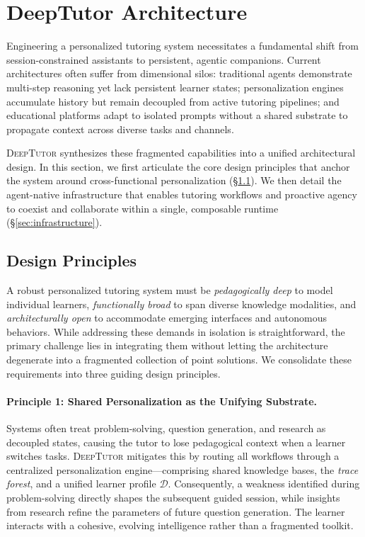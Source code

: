 \section{DeepTutor Architecture}
\label{sec:overview}

Engineering a personalized tutoring system necessitates a fundamental shift from session-constrained assistants to persistent, agentic companions.
Current architectures often suffer from dimensional silos:
traditional agents demonstrate multi-step reasoning yet lack persistent learner states; personalization engines accumulate history but remain decoupled from active tutoring pipelines; and educational platforms adapt to isolated prompts without a shared substrate to propagate context across diverse tasks and channels.

\textsc{DeepTutor} synthesizes these fragmented capabilities into a unified architectural design. In this section, we first articulate the core design principles that anchor the system around cross-functional personalization (\S\ref{sec:principles}). We then detail the agent-native infrastructure that enables tutoring workflows and proactive agency to coexist and collaborate within a single, composable runtime (\S\ref{sec:infrastructure}).


\subsection{Design Principles}
\label{sec:principles}
A robust personalized tutoring system must be \textit{pedagogically deep} to model individual learners, \textit{functionally broad} to span diverse knowledge modalities, and \textit{architecturally open} to accommodate emerging interfaces and autonomous behaviors. While addressing these demands in isolation is straightforward, the primary challenge lies in integrating them without letting the architecture degenerate into a fragmented collection of point solutions. We consolidate these requirements into three guiding design principles.

\paragraph{Principle 1: Shared Personalization as the Unifying Substrate.}
Systems often treat problem-solving, question generation, and research as decoupled states, causing the tutor to lose pedagogical context when a learner switches tasks. \textsc{DeepTutor} mitigates this by routing all workflows through a centralized personalization engine—comprising shared knowledge bases, the \emph{trace forest}, and a unified learner profile $\mathcal{D}$. Consequently, a weakness identified during problem-solving directly shapes the subsequent guided session, while insights from research refine the parameters of future question generation. The learner interacts with a cohesive, evolving intelligence rather than a fragmented toolkit.
